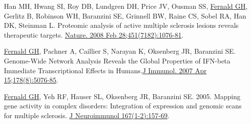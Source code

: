 \begin{resume}
Han MH, Hwang SI, Roy DB, Lundgren DH, Price JV, Ousman SS, \underline{Fernald GH}, Gerlitz B, Robinson WH, Baranzini SE, Grinnell BW, Raine CS, Sobel RA, Han DK, Steinman L. Proteomic analysis of active multiple sclerosis lesions reveals therapeutic targets. \href{http://www.ncbi.nlm.nih.gov/entrez/query.fcgi?db=pubmed&cmd=Retrieve&dopt=AbstractPlus&list_uids=18278032}{Nature. 2008 Feb 28;451(7182):1076-81}.

\underline{Fernald GH}, Pachner A, Caillier S, Narayan K, Oksenberg JR, Baranzini SE.  Genome-Wide Network Analysis Reveals the Global Properties of IFN-beta Immediate Transcriptional Effects in Humans.\href{http://www.ncbi.nlm.nih.gov/entrez/query.fcgi?db=pubmed&cmd=Retrieve&dopt=AbstractPlus&list_uids=17404290}{J Immunol. 2007 Apr 15;178(8):5076-85}.

\underline{Fernald GH}, Yeh RF, Hauser SL, Oksenberg JR, Baranzini SE. 2005. Mapping gene activity in complex disorders: Integration of expression and genomic scans for multiple sclerosis. \href{http://www.ncbi.nlm.nih.gov/entrez/query.fcgi?db=pubmed&cmd=Retrieve&dopt=AbstractPlus&list_uids=16129498}{J Neuroimmunol 167(1-2):157-69}.









\end{resume}
